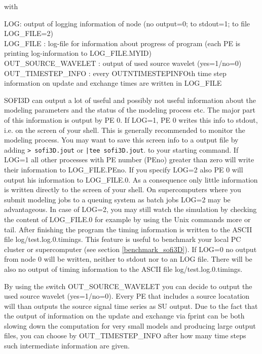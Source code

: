 \documentclass[11pt,onecolumn,oneside]{article}
\begin{document}
with

LOG: output of logging information of node (no output=0; to stdout=1; to file LOG\_FILE=2)\\
LOG\_FILE : log-file for information about progress of program (each PE is printing log-information to LOG\_FILE.MYID) \\
OUT\_SOURCE\_WAVELET : output of used source wavelet (yes=1/no=0) \\
OUT\_TIMESTEP\_INFO : every OUTNTIMESTEPINFOth time step information on update and exchange times are written in LOG\_FILE 


SOFI3D can output a lot of useful and possibly not useful information about the modeling parameters and the status of the modeling process etc. The major part of this information is output by PE 0.
If LOG=1, PE 0 writes this info to stdout, i.e. on the screen of your shell. This is generally recommended  to monitor the modeling process. You may want to save this screen info to a output file by adding  \lstinline{> sofi3D.jout} or  \lstinline{|tee sofi3D.jout}. to your starting command. If LOG=1 all other processes with PE number (PEno) greater than zero will write their information to LOG\_FILE.PEno. If you specify LOG=2 also PE 0 will output his information to LOG\_FILE.0. As a consequence only little information is written directly to the screen of your shell. On supercomputers where you submit modeling jobs to a queuing system as batch jobs LOG=2 may be advantageous. In case of LOG=2, you may still watch the simulation by checking the content of LOG\_FILE.0 for example by using the Unix commands more or tail. After finishing the program the timing information is written to the ASCII file log/test.log.0.timings. This feature is useful to benchmark your local PC cluster or supercomputer (see section \ref{benchmark_sofi3D}). If LOG=0 no output from node 0 will be written, neither to stdout nor to an LOG file. There will be also no output of timing information to the ASCII file log/test.log.0.timings. 

By using the switch OUT\_SOURCE\_WAVELET you can decide to output the used source wavelet (yes=1/no=0). Every PE that includes a source locatation will than outputs the source signal time series as SU output. Due to the fact that the output of information on the update and exchange via fprint can be both slowing down the computation for very small models and producing large output files, you can choose by OUT\_TIMESTEP\_INFO after how many time steps such intermediate information are given.
\end{document}
